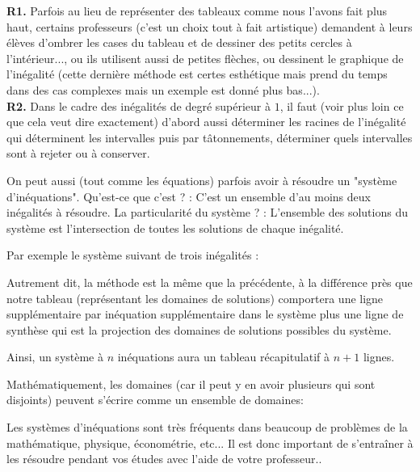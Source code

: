 	\begin{tcolorbox}[title=Remarques,colframe=black,arc=10pt]
	\textbf{R1.} Parfois au lieu de représenter des tableaux comme nous l'avons fait plus haut, certains professeurs (c'est un choix tout à fait artistique) demandent à leurs élèves d'ombrer les cases du tableau et de dessiner des petits cercles à l'intérieur..., ou ils utilisent aussi de petites flèches, ou dessinent le graphique de l'inégalité (cette dernière méthode est certes esthétique mais prend du temps dans des cas complexes mais un exemple est donné plus bas...).\\
	
	\textbf{R2.} Dans le cadre des inégalités de degré supérieur à $1$, il faut (voir plus loin ce que cela veut dire exactement) d'abord aussi déterminer les racines de l'inégalité qui déterminent les intervalles puis par tâtonnements, déterminer quels intervalles sont à rejeter ou à conserver.
	\end{tcolorbox}
	On peut aussi (tout comme les équations) parfois avoir à résoudre un "système d'inéquations". Qu'est-ce que c'est ? : C'est un ensemble d'au moins deux inégalités à résoudre. La particularité du système ? : L'ensemble des solutions du système est l'intersection de toutes les solutions de chaque inégalité.
	
	Par exemple le système suivant de trois inégalités :
	
	Autrement dit, la méthode est la même que la précédente, à la différence près que notre tableau (représentant les domaines de solutions) comportera une ligne supplémentaire par inéquation supplémentaire dans le système plus une ligne de synthèse qui est la projection des domaines de solutions possibles du système.
	
	Ainsi, un système à $n$ inéquations aura un tableau récapitulatif à $n+1$ lignes.
	
	Mathématiquement, les domaines (car il peut y en avoir plusieurs qui sont disjoints) peuvent s'écrire comme un ensemble de domaines:
	
	Les systèmes d'inéquations sont très fréquents dans beaucoup de problèmes de la mathématique, physique, économétrie, etc... Il est donc important de s'entraîner à les résoudre pendant vos études avec l'aide de votre professeur..
	
